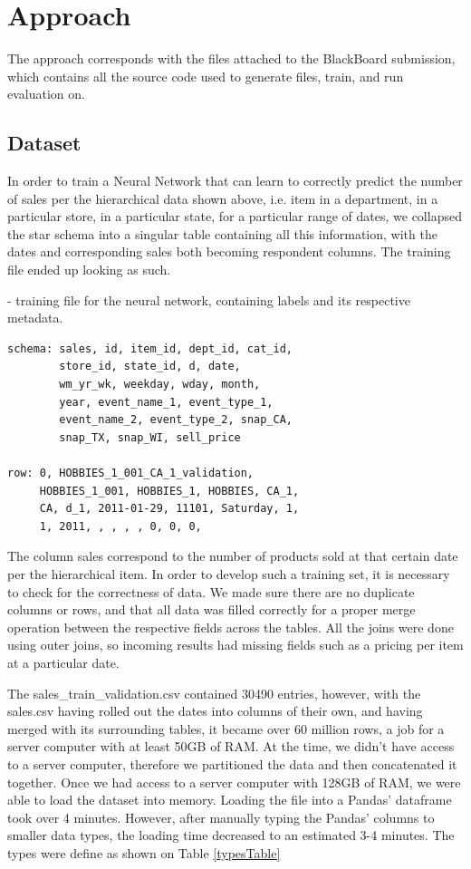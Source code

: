 \documentclass[10pt,twocolumn,letterpaper]{article}
\begin{document}
\section{Approach}
  The approach corresponds with the files attached to the BlackBoard submission,
  which contains all the source code used to generate files, train, and run
  evaluation on.

\subsection{Dataset}
  In order to train a Neural Network that can learn to correctly predict the
  number of sales per the hierarchical data shown above, i.e. item in a
  department, in a particular store, in a particular state, for a particular
  range of dates, we collapsed the star schema into a singular table containing
  all this information, with the dates and corresponding sales both
  becoming respondent columns. The training file ended up looking as such.

 - training file for the neural network, containing
labels and its respective metadata.

{\small\begin{verbatim}
schema: sales, id, item_id, dept_id, cat_id,
        store_id, state_id, d, date,
        wm_yr_wk, weekday, wday, month,
        year, event_name_1, event_type_1,
        event_name_2, event_type_2, snap_CA,
        snap_TX, snap_WI, sell_price

row: 0, HOBBIES_1_001_CA_1_validation,
     HOBBIES_1_001, HOBBIES_1, HOBBIES, CA_1,
     CA, d_1, 2011-01-29, 11101, Saturday, 1,
     1, 2011, , , , , 0, 0, 0,
\end{verbatim}}


The column sales correspond to the number of products sold at that certain date
per the hierarchical item. In order to develop such a training set, it is
necessary to check for the correctness of data. We made sure there are no
duplicate columns or rows, and that all data was filled correctly for a proper
merge operation between the respective fields across the tables. All the joins
were done using outer joins, so incoming results had missing fields such as a
pricing per item at a particular date.

 The sales\_train\_validation.csv contained 30490 entries, however, with the
sales.csv having rolled out the dates into columns of their own, and having
merged with its surrounding tables, it became over 60 million rows, a job for a
server computer with at least 50GB of RAM. At the time, we didn't have access to
a server computer, therefore we partitioned the data and then concatenated it
together. Once we had access to a server computer with 128GB of RAM, we were
able to load the dataset into memory. Loading the file into a Pandas' dataframe
took over 4 minutes. However, after manually typing the Pandas' columns to
smaller data types, the loading time decreased to an estimated 3-4 minutes. The
types were define as shown on Table \ref{typesTable}
\end{document}
